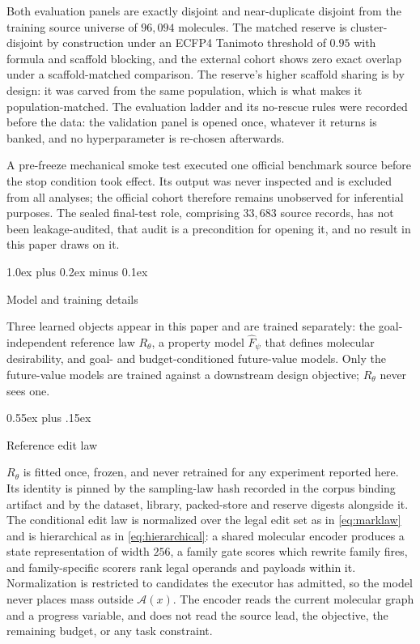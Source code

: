 \documentclass{article}
\makeatletter
\theoremstyle{definition}
\theoremstyle{remark}
\def\section{\@startsection{section}{1}{\z@}{-1.4ex plus -0.4ex minus -.2ex}%
  {1.0ex plus 0.2ex minus 0.1ex}{\large\sc\raggedright}}
\def\subsection{\@startsection{subsection}{2}{\z@}{-1.2ex plus -0.4ex minus -.2ex}%
  {0.55ex plus .15ex}{\normalsize\sc\raggedright}}
\newcommand{\A}{\mathcal{A}}
\makeatother
\begin{document}
Both evaluation panels are exactly disjoint and near-duplicate disjoint from the training source universe of $96{,}094$ molecules. The matched reserve is cluster-disjoint by construction under an ECFP4 Tanimoto threshold of $0.95$ with formula and scaffold blocking, and the external cohort shows zero exact overlap under a scaffold-matched comparison. The reserve's higher scaffold sharing is by design: it was carved from the same population, which is what makes it population-matched. The evaluation ladder and its no-rescue rules were recorded before the data: the validation panel is opened once, whatever it returns is banked, and no hyperparameter is re-chosen afterwards.

A pre-freeze mechanical smoke test executed one official benchmark source before the stop condition took effect. Its output was never inspected and is excluded from all analyses; the official cohort therefore remains unobserved for inferential purposes. The sealed final-test role, comprising $33{,}683$ source records, has not been leakage-audited, that audit is a precondition for opening it, and no result in this paper draws on it.

\section{Model and training details}
\label{app:models}

Three learned objects appear in this paper and are trained separately: the goal-independent reference law $R_\theta$, a property model $\widehat F_\psi$ that defines molecular desirability, and goal- and budget-conditioned future-value models. Only the future-value models are trained against a downstream design objective; $R_\theta$ never sees one.

\subsection{Reference edit law}

$R_\theta$ is fitted once, frozen, and never retrained for any experiment reported here. Its identity is pinned by the sampling-law hash recorded in the corpus binding artifact and by the dataset, library, packed-store and reserve digests alongside it. The conditional edit law is normalized over the legal edit set as in \eqref{eq:marklaw} and is hierarchical as in \eqref{eq:hierarchical}: a shared molecular encoder produces a state representation of width $256$, a family gate scores which rewrite family fires, and family-specific scorers rank legal operands and payloads within it. Normalization is restricted to candidates the executor has admitted, so the model never places mass outside $\A(x)$. The encoder reads the current molecular graph and a progress variable, and does not read the source lead, the objective, the remaining budget, or any task constraint.
\end{document}
